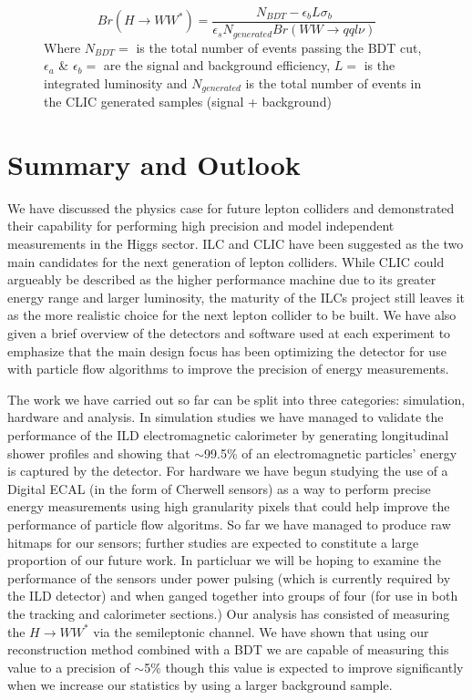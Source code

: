 \begin{figure}
  \begin{equation}
    \label{Eq:branching ratio}
    Br(H\rightarrow WW^*) = \frac{N_{BDT} - \epsilon_bL\sigma_{b}}{\epsilon_{s}N_{generated}Br(WW\rightarrow qql\nu)}
  \end{equation}
  Where ${N_{BDT}=}$ is the total number of events passing the BDT cut, ${\epsilon_a}$ \& ${\epsilon_b=}$ are the signal and background efficiency, ${L=}$ is the integrated luminosity and ${N_{generated}}$ is the total number of events in the CLIC generated samples (signal + background) 
\end{figure}

\chapter{Summary and Outlook}
  
We have discussed the physics case for future lepton colliders and demonstrated their capability for performing high precision and model independent measurements in the Higgs sector. \ac{ILC} and \ac{CLIC} have been suggested as the two main candidates for the next generation of lepton colliders. While \ac{CLIC} could argueably be described as the higher performance machine due to its greater energy range and larger luminosity, the maturity of the \ac{ILC}s project still leaves it as the more realistic choice for the next lepton collider to be built. We have also given a brief overview of the detectors and software used at each experiment to emphasize that the main design focus has been optimizing the detector for use with particle flow algorithms to improve the precision of energy measurements.

The work we have carried out so far can be split into three categories: simulation, hardware and analysis. In simulation studies we have managed to validate the performance of the \ac{ILD} electromagnetic calorimeter by generating longitudinal shower profiles and showing that ${\sim}$99.5\% of an electromagnetic particles' energy is captured by the detector. For hardware we have begun studying the use of a Digital \ac{ECAL} (in the form of Cherwell sensors) as a way to perform precise energy measurements using high granularity pixels that could help improve the performance of particle flow algoritms. So far we have managed to produce raw hitmaps for our sensors; further studies are expected to constitute a large proportion of our future work. In particluar we will be hoping to examine the performance of the sensors under power pulsing (which is currently required by the ILD detector) and when ganged together into groups of four (for use in both the tracking and calorimeter sections.) Our analysis has consisted of measuring the ${H\rightarrow WW^*}$ via the semileptonic channel. We have shown that using our reconstruction method combined with a \ac{BDT} we are capable of measuring this value to a precision of ${\sim}$5\% though this value is expected to improve significantly when we increase our statistics by using a larger background sample.


